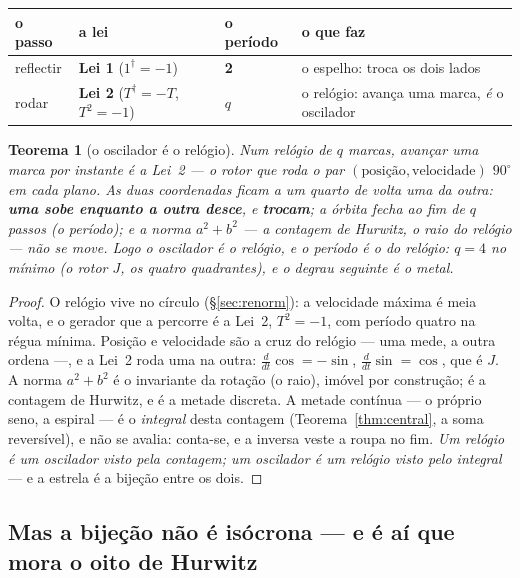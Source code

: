 \documentclass[11pt,a4paper]{article}
\newtheorem{teorema}{Teorema}
\newcommand{\dg}{^{\dagger}}
\begin{document}
\begin{center}\small
\begin{tabular}{@{}llll@{}}
\toprule
o passo & a lei & o período & o que faz \\
\midrule
reflectir & \textbf{Lei 1} ($1\dg=-1$) & \textbf{2} & o espelho: troca os dois lados \\
rodar & \textbf{Lei 2} ($T\dg=-T$, $T^2=-1$) & \textbf{$q$} & o relógio: avança uma marca, \emph{é} o oscilador \\
\bottomrule
\end{tabular}
\end{center}

\begin{teorema}[o oscilador é o relógio]\label{thm:osciladorrelogio}
Num relógio de $q$ marcas, avançar uma marca por instante é a Lei~2 --- o rotor que roda o par
$(\text{posição},\text{velocidade})$ $90^\circ$ em cada plano. As duas coordenadas ficam a um quarto
de volta uma da outra: \textbf{uma sobe enquanto a outra desce}, e \textbf{trocam}; a órbita fecha ao
fim de $q$ passos (o \emph{período}); e a norma $a^2+b^2$ --- a contagem de Hurwitz, o raio do relógio
--- \emph{não se move}. Logo o oscilador \emph{é} o relógio, e o período é o do relógio: $q=4$ no
mínimo (o rotor $J$, os quatro quadrantes), e o degrau seguinte é o metal.
\end{teorema}

\begin{proof}
O relógio vive no círculo (\S\ref{sec:renorm}): a velocidade máxima é meia volta, e o gerador que a
percorre é a Lei~2, $T^2=-1$, com período quatro na régua mínima. Posição e velocidade são a cruz do
relógio --- uma mede, a outra ordena ---, e a Lei~2 roda uma na outra: $\frac{d}{dt}\cos=-\sin$,
$\frac{d}{dt}\sin=\cos$, que é $J$. A norma $a^2+b^2$ é o invariante da rotação (o raio), imóvel por
construção; é a contagem de Hurwitz, e é a metade discreta. A metade contínua --- o próprio seno, a
espiral --- é o \emph{integral} desta contagem (Teorema~\ref{thm:central}, a soma reversível), e não
se avalia: conta-se, e a inversa veste a roupa no fim. \emph{Um relógio é um oscilador visto pela
contagem; um oscilador é um relógio visto pelo integral} --- e a estrela é a bijeção entre os dois.
\end{proof}

\subsection*{Mas a bijeção não é isócrona --- e é aí que mora o oito de Hurwitz}\label{sub:isocrona}
\end{document}
